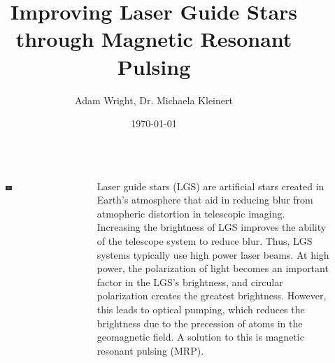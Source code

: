 \documentclass[
30pt,%
a1paper, 
landscape,%
margin = 0mm,
innermargin = -2cm,
colspace = 5mm,
subcolspace = 0mm,
blockverticalspace=.5cm %
]{tikzposter}
\title{Improving Laser Guide Stars through Magnetic Resonant Pulsing}
\author{Adam Wright, Dr. Michaela Kleinert}
\date{\today}
\institute{Department of Physics, Willamette University, Salem, OR 97301}
\begin{document}
 
\maketitle

\begin{columns}
\centering


	
	{

\begin{figure}
	\begin{tikzfigure}[] 
			\includegraphics[width=0.13\textwidth]{Images/lgsvlt.png}
		\end{tikzfigure}
\end{figure}

Laser guide stars (LGS) are artificial stars created in Earth's atmosphere that aid in reducing blur from atmopheric distortion in telescopic imaging. Increasing the brightness of LGS improves the ability of the telescope system to reduce blur. Thus, LGS systems typically use high power laser beams. At high power, the polarization of light becomes an important factor in the LGS's brightness, and circular polarization creates the greatest brightness. However, this leads to optical pumping, which reduces the brightness due to the precession of atoms in the geomagnetic field. A solution to this is magnetic resonant pulsing (MRP).

}
\end{columns}
\end{document}
